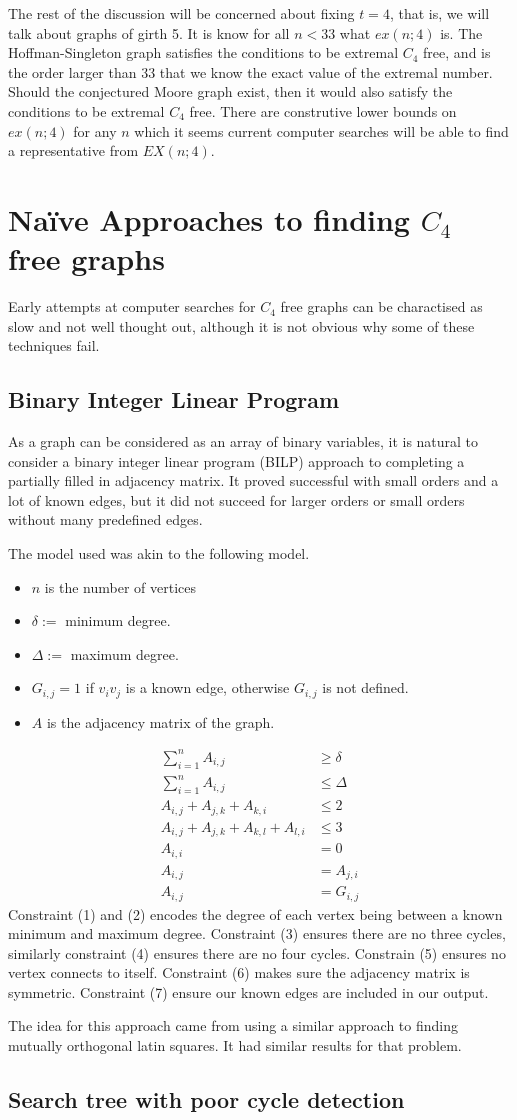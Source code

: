 \documentclass[a4paper]{article}
\begin{document}
The rest of the discussion will be concerned about fixing $t=4$, that is, we will talk about graphs of girth 5. It is know for all $n<33$ what $ex(n; 4)$ is. The Hoffman-Singleton graph satisfies the conditions to be extremal $C_4$ free, and is the order larger than 33 that we know the exact value of the extremal number. Should the conjectured Moore graph exist, then it would also satisfy the conditions to be extremal $C_4$ free. There are construtive lower bounds on $ex(n; 4)$ for any $n$ which it seems current computer searches will be able to find a representative from $EX(n; 4)$.

\section{Na\"ive Approaches to finding $C_4$ free graphs}
Early attempts at computer searches for $C_4$ free graphs can be charactised as slow and not well thought out, although it is not obvious why some of these techniques fail.
\subsection{Binary Integer Linear Program}
As a graph can be considered as an array of binary variables, it is natural to consider a binary integer linear program (BILP) approach to completing a partially filled in adjacency matrix. It proved successful with small orders and a lot of known edges, but it did not succeed for larger orders or small orders without many predefined edges.

The model used was akin to the following model.
\begin{itemize}
	\item $n$ is the number of vertices
	\item $\delta:=$ minimum degree.
	\item $\Delta:=$ maximum degree.
	\item $G_{i,j} = 1$ if $v_iv_j$ is a known edge, otherwise $G_{i,j}$ is not defined.
	\item $A$ is the adjacency matrix of the graph.
\end{itemize}
\begin{align}
\sum_{i=1}^{n}A_{i,j}&\geq\delta \\
\sum_{i=1}^{n}A_{i,j}&\leq\Delta \\
A_{i,j}+A_{j,k}+A_{k,i} &\leq 2 \\
A_{i,j}+A_{j,k}+A_{k,l}+A_{l,i} &\leq 3 \\
A_{i,i}&=0 \\
A_{i,j}&=A_{j,i} \\
A_{i,j}&=G_{i,j}
\end{align}
Constraint (1) and (2) encodes the degree of each vertex being between a known minimum and maximum degree. Constraint (3) ensures there are no three cycles, similarly constraint (4) ensures there are no four cycles. Constrain (5) ensures no vertex connects to itself. Constraint (6) makes sure the adjacency matrix is symmetric. Constraint (7) ensure our known edges are included in our output.

The idea for this approach came from using a similar approach to finding mutually orthogonal latin squares. It had similar results for that problem.

\subsection{Search tree with poor cycle detection}
\end{document}
